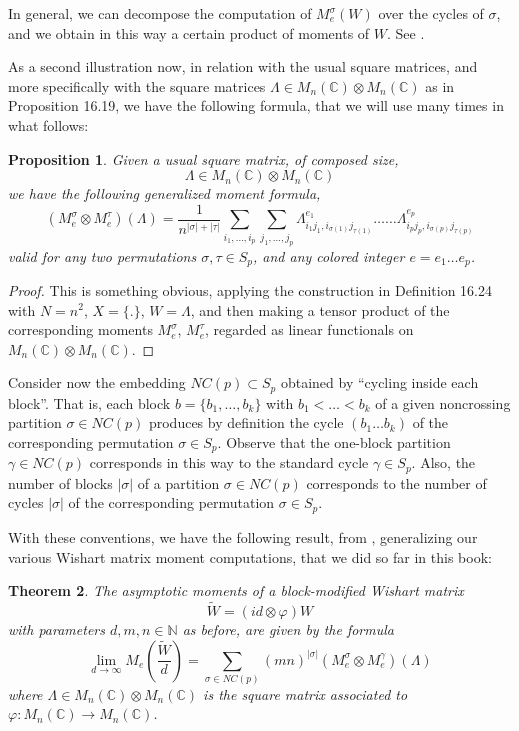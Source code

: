 \documentclass[12pt]{amsbook}
\newtheorem{theorem}{Theorem}[chapter]
\newtheorem{proposition}[theorem]{Proposition}
\begin{document}
In general, we can decompose the computation of $M^\sigma_e(W)$ over the cycles of $\sigma$, and we obtain in this way a certain product of moments of $W$. See \cite{nsp}.

\bigskip

As a second illustration now, in relation with the usual square matrices, and more specifically with the square matrices $\Lambda\in M_n(\mathbb C)\otimes M_n(\mathbb C)$ as in Proposition 16.19, we have the following formula, that we will use many times in what follows:

\begin{proposition}
Given a usual square matrix, of composed size,
$$\Lambda\in M_n(\mathbb C)\otimes M_n(\mathbb C)$$
we have the following generalized moment formula,
$$(M^\sigma_e\otimes M^\tau_e)(\Lambda)=\frac{1}{n^{|\sigma|+|\tau|}}\sum_{i_1,\ldots, i_p}\sum_{j_1,\ldots,j_p}\Lambda_{i_1j_1,i_{\sigma(1)}j_{\tau(1)}}^{e_1}\ldots\ldots\Lambda_{i_pj_p,i_{\sigma(p)}j_{\tau(p)}}^{e_p}$$
valid for any two permutations $\sigma,\tau\in S_p$, and any colored integer $e=e_1\ldots e_p$.
\end{proposition}

\begin{proof}
This is something obvious, applying the construction in Definition 16.24 with $N=n^2$, $X=\{.\}$, $W=\Lambda$, and then making a tensor product of the corresponding moments $M^\sigma_e$, $M^\tau_e$, regarded as linear functionals on $M_n(\mathbb C)\otimes M_n(\mathbb C)$.
\end{proof}

Consider now the embedding $NC(p)\subset S_p$ obtained by ``cycling inside each block''. That is, each block $b=\{b_1,\ldots,b_k\}$ with $b_1<\ldots<b_k$ of a given noncrossing partition $\sigma\in NC(p)$ produces by definition the cycle $(b_1\ldots b_k)$ of the corresponding permutation $\sigma\in S_p$. Observe that the one-block partition $\gamma\in NC(p)$ corresponds in this way to the standard cycle $\gamma\in S_p$. Also, the number of blocks $|\sigma|$ of a partition $\sigma\in NC(p)$ corresponds to the number of cycles $|\sigma|$ of the corresponding permutation $\sigma\in S_p$. 

\bigskip

With these conventions, we have the following result, from \cite{bn2}, generalizing our various Wishart matrix moment computations, that we did so far in this book:


\begin{theorem}
The asymptotic moments of a block-modified Wishart matrix 
$$\widetilde{W}=(id\otimes\varphi)W$$
with parameters $d,m,n\in\mathbb N$ as before, are given by the formula
$$\lim_{d\to\infty}M_e\left(\frac{\widetilde{W}}{d}\right)=\sum_{\sigma\in NC(p)}(mn)^{|\sigma|}(M^\sigma_e\otimes M^\gamma_e)(\Lambda)$$
where $\Lambda\in M_n(\mathbb C)\otimes M_n(\mathbb C)$ is the square matrix associated to $\varphi:M_n(\mathbb C)\to M_n(\mathbb C)$.
\end{theorem}
\end{document}
